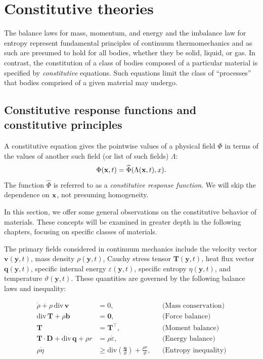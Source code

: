 
\chapter{Constitutive theories}\label{constheory}

The balance laws for mass, momentum, and energy and the imbalance law for entropy represent fundamental principles of continuum thermomechanics and as such are presumed to hold for all bodies, whether they be solid, liquid, or gas. In contrast, the constitution of a class of bodies composed of a particular material is specified by \textit{constitutive} equations. Such equations limit the class of ``processes'' that bodies comprised of a given material may undergo.

\section{Constitutive response functions and constitutive principles}
A constitutive equation gives the pointwise values of a physical field $\Phi$ in terms of the values of another such field (or list of such fields) $\Lambda$:
\begin{equation}
	\Phi(\mathbf{x},t)=\widehat{\Phi}(\Lambda(\mathbf{x},t),x).
\end{equation}
The function $\widehat{\Phi}$ is referred to as a \textit{constitutive response function}. We will skip the dependence on $\mathbf{x}$, not presuming homogeneity.

In this section, we offer some general observations on the constitutive behavior of materials. These concepts will be examined in greater depth in the following chapters, focusing on specific classes of materials.

The primary fields considered in continuum mechanics include the velocity vector \( \mathbf{v}(\mathbf{y}, t) \), mass density \( \rho(\mathbf{y}, t) \), Cauchy stress tensor \( \mathbf{T}(\mathbf{y}, t) \), heat flux vector \( \mathbf{q}(\mathbf{y}, t) \), specific internal energy \( \varepsilon(\mathbf{y}, t) \), specific entropy \( \eta(\mathbf{y}, t) \), and temperature \( \vartheta(\mathbf{y}, t) \). These quantities are governed by the following balance laws and inequality:

\begin{definition}
	\begin{equation}\label{fieldeq}
	\begin{aligned}
		\dot{\rho} + \rho\, \text{div}\, \mathbf{v} &= 0, && \text{(Mass conservation)} \\
		\text{div}\, \mathbf{T} + \rho \mathbf{b} &= \mathbf{0}, && \text{(Force balance)} \\
		\mathbf{T} &= \mathbf{T}^\top, && \text{(Moment balance)} \\
		\mathbf{T} \cdot \mathbf{D} + \text{div}\, \mathbf{q} + \rho r &= \rho \dot{\varepsilon}, && \text{(Energy balance)} \\
		\rho \dot{\eta} &\geq \text{div} \left( \frac{\mathbf{q}}{\vartheta} \right) + \frac{\rho r}{\vartheta}, && \text{(Entropy inequality)}
	\end{aligned}
\end{equation}
\end{definition}

